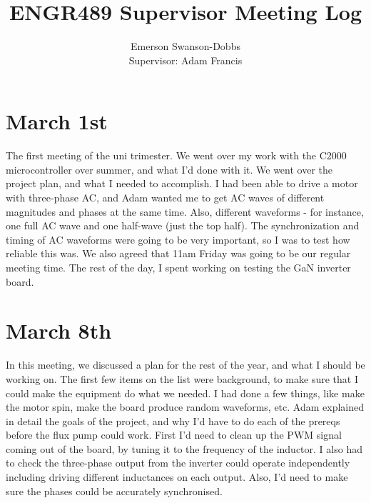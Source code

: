 \documentclass{article}
\title{ENGR489 Supervisor Meeting Log}
\author{Emerson Swanson-Dobbs\\Supervisor: Adam Francis}
\date{}
\begin{document}
\maketitle

\section*{March 1st}

The first meeting of the uni trimester. We went over my work with the C2000 microcontroller over summer, and what I'd done with it. We went over the project plan, and what I needed to accomplish. I had been able to drive a motor with three-phase AC, and Adam wanted me to get AC waves of different magnitudes and phases at the same time. Also, different waveforms - for instance, one full AC wave and one half-wave (just the top half). The synchronization and timing of AC waveforms were going to be very important, so I was to test how reliable this was. We also agreed that 11am Friday was going to be our regular meeting time. The rest of the day, I spent working on testing the GaN inverter board.

\section*{March 8th}
In this meeting, we discussed a plan for the rest of the year, and what I should be working on. The first few items on the list were background, to make sure that I could make the equipment do what we needed. I had done a few things, like make the motor spin, make the board produce random waveforms, etc. Adam explained in detail the goals of the project, and why I'd have to do each of the prereqs before the flux pump could work. First I'd need to clean up the PWM signal coming out of the board, by tuning it to the frequency of the inductor. I also had to check the three-phase output from the inverter could operate independently including driving different inductances on each output. Also, I'd need to make sure the phases could be accurately synchronised.
\end{document}

